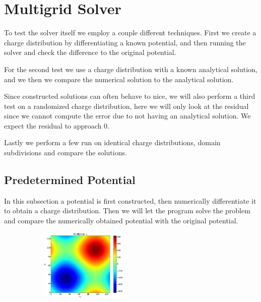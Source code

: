 \section{Multigrid Solver}
	To test the solver itself we employ a couple different techniques. First we
	create a charge distribution by differentiating a known potential, and then
	running the solver and check the difference to the original potential.

	For the second test we use a charge distribution with a known analytical solution,
	and we then we compare the numerical solution to the analytical solution.

	Since constructed solutions can often behave to nice, we will also perform
	a third test on a randomized charge distribution, here we will only look at the
	residual since we cannot compute the error due to not having an analytical solution.
	We expect the residual to approach \(0\).

	Lastly we perform a few run on identical charge distributions, domain subdivisions
	and compare the solutions.

\subsection{Predetermined Potential}
		In this subsection a potential is first constructed, then numerically differentiate
		it to obtain a charge distribution. Then we will let the program solve the
		problem and compare the numerically obtained potential with the original potential.

		\begin{figure}
			\centering
			\begin{subfigure}[b]{0.45\textwidth}
			\includegraphics[width = 0.45\textwidth]{figures/verification/sinusoidal/analytical.pdf}
			\end{subfigure}
			\begin{subfigure}[b]{0.45\textwidth}
		\end{subfigure}
		\end{figure}





